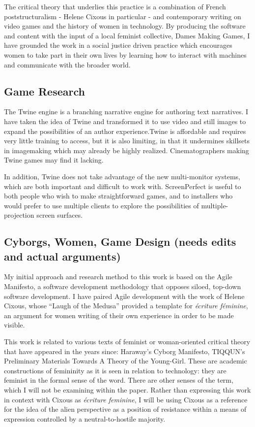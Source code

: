 The critical theory that underlies this practice is a combination of French poststructuralism - Helene Cixous in particular - and contemporary writing on video games and the history of women in technology. By producing the software and content with the input of a local feminist collective, Dames Making Games, I have grounded the work in a social justice driven practice which encourages women to take part in their own lives by learning how to interact with machines and communicate with the broader world.

\subsection{Game Research}

The Twine engine is a branching narrative engine for authoring text narratives. I have taken the idea of Twine and transformed it to use video and still images to expand the possibilities of an author experience.Twine is affordable and requires very little training to access, but it is also limiting, in that it undermines skillsets in imagemaking which may already be highly realized. Cinematographers making Twine games may find it lacking.

In addition, Twine does not take advantage of the new multi-monitor systems, which are both important and difficult to work with. ScreenPerfect is useful to both people who wish to make straightforward games, and to installers who would prefer to use multiple clients to explore the possibilities of multiple-projection screen surfaces.

\subsection{Cyborgs, Women, Game Design (needs edits and actual arguments)}

My initial approach and research method to this work is based on the Agile Manifesto, a software development methodology that opposes siloed, top-down software development. I have paired Agile development with the work of Helene Cixous, whose “Laugh of the Medusa” provided a template for \textit{écriture féminine}, an argument for women writing of their own experience in order to be made visible.

This work is related to various texts of feminist or woman-oriented critical theory that have appeared in the years since: Haraway’s Cyborg Manifesto, TIQQUN’s Preliminary Materials Towards A Theory of the Young-Girl. These are academic constructions of femininity as it is seen in relation to technology: they are feminist in the formal sense of the word. There are other senses of the term, which I will not be examining within the paper. Rather than expressing this work in context with Cixous as \textit{écriture feminine}, I will be using Cixous as a reference for the idea of the alien perspective as a position of resistance within a means of expression controlled by a neutral-to-hostile majority. 

